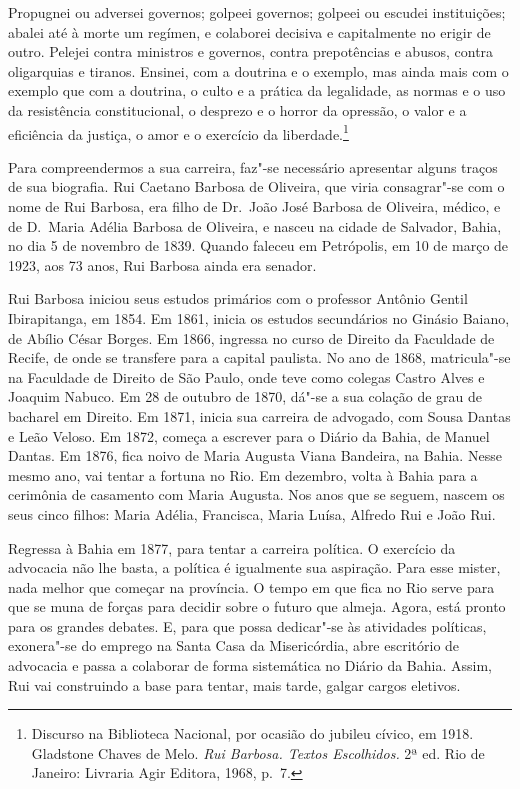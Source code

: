 \begin{hedraquote}
Propugnei ou adversei governos; golpeei
governos; golpeei ou escudei instituições; abalei até à morte um
regímen, e colaborei decisiva e capitalmente no erigir de outro.
Pelejei contra ministros e governos, contra prepotências e abusos,
contra oligarquias e tiranos. Ensinei, com a doutrina e o exemplo, mas
ainda mais com o exemplo que com a doutrina, o culto e a prática da
legalidade, as normas e o uso da resistência constitucional, o desprezo
e o horror da opressão, o valor e a eficiência da justiça, o amor e o
exercício da liberdade.\footnote{ Discurso na Biblioteca Nacional, por ocasião
do jubileu cívico, em 1918.  Gladstone Chaves de Melo. \textit{Rui 
Barbosa. Textos Escolhidos.} 2ª ed. Rio de Janeiro: Livraria Agir Editora, 
1968, p.~7.}
\end{hedraquote}


Para compreendermos a sua carreira, faz"-se necessário apresentar alguns traços
de sua biografia.  Rui Caetano Barbosa de Oliveira, que viria
consagrar"-se com o nome de Rui Barbosa, era filho de Dr.~João José
Barbosa de Oliveira, médico, e de D.~Maria Adélia Barbosa de Oliveira, e nasceu 
na cidade de Salvador, Bahia, no dia 5 de novembro de 1839. Quando faleceu em 
Petrópolis, em 10 de março de 1923, aos 73 anos, Rui Barbosa ainda era senador. 

Rui Barbosa iniciou seus estudos primários com o professor Antônio Gentil
Ibirapitanga, em 1854. Em 1861, inicia os estudos secundários no
Ginásio Baiano, de Abílio César Borges. Em 1866, ingressa no curso de
Direito da Faculdade de Recife, de onde se transfere para a capital
paulista. No ano de 1868, matricula"-se na Faculdade de Direito de São
Paulo, onde teve como colegas Castro Alves e Joaquim Nabuco. Em 28 de
outubro de 1870, dá"-se a sua colação de grau de bacharel em Direito. Em
1871, inicia sua carreira de advogado, com Sousa Dantas e Leão Veloso.
Em 1872, começa a escrever para o Diário da Bahia, de Manuel Dantas. Em
1876, fica noivo de Maria Augusta Viana Bandeira, na Bahia. Nesse mesmo
ano, vai tentar a fortuna no Rio. Em dezembro, volta à Bahia para a 
cerimônia de casamento com Maria Augusta. Nos anos que se seguem, 
nascem os seus cinco filhos: Maria Adélia, Francisca, Maria Luísa, Alfredo Rui e João Rui.

Regressa à Bahia em 1877, para tentar a carreira política. O exercício
da advocacia não lhe basta, a política é igualmente sua aspiração. Para
esse mister, nada melhor que começar na província. 
O tempo em que fica no Rio serve para que se muna de forças
para decidir sobre o futuro que almeja. Agora, está pronto para os
grandes debates. E, para que possa dedicar"-se às atividades políticas,
exonera"-se do emprego na Santa Casa da Misericórdia, abre escritório de
advocacia e passa a colaborar de forma sistemática no Diário da Bahia.
Assim, Rui vai construindo a base para tentar, mais tarde, galgar
cargos eletivos.

